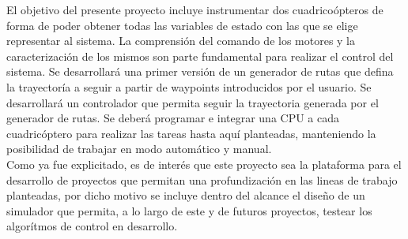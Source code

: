 \documentclass[main]{subfiles}
\begin{document}
El objetivo del presente proyecto incluye instrumentar dos cuadrico\'opteros de forma de poder obtener todas las variables de estado con las que se elige representar al sistema. La comprensi\'on del comando de los motores y la caracterizaci\'on de los mismos son parte fundamental para realizar el control del sistema. Se desarrollar\'a una primer versi\'on de un generador de rutas que defina la trayector\'ia a seguir a partir de waypoints introducidos por el usuario. Se desarrollar\'a un controlador que permita seguir la trayectoria generada por el generador de rutas. Se deber\'a programar e integrar una CPU a cada cuadric\'optero para realizar las tareas hasta aqu\'i planteadas, manteniendo la posibilidad de trabajar en modo autom\'atico y manual.\\

Como ya fue explicitado, es de inter\'es que este proyecto sea la plataforma para el desarrollo de proyectos que permitan una profundizaci\'on en las lineas de trabajo planteadas, por dicho motivo se incluye dentro del alcance el diseño de un simulador que permita, a lo largo de este y de futuros proyectos, testear los algor\'itmos de control en desarrollo.
\end{document}
